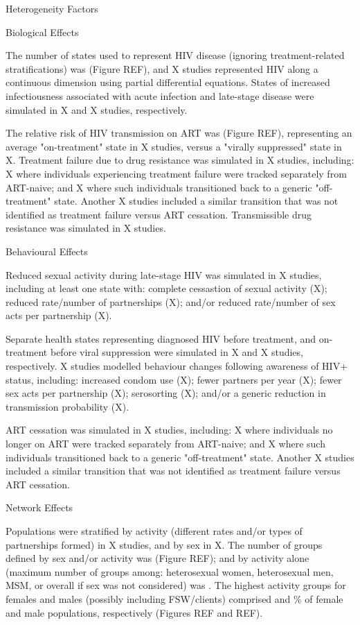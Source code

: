 Heterogeneity Factors

Biological Effects

The \xdmdef number of states used to represent HIV disease
(ignoring treatment-related stratifications) was  (Figure REF),
and X studies represented HIV along a continuous dimension
using partial differential equations.
States of increased infectiousness associated with acute infection and late-stage disease
were simulated in X and X studies, respectively.

The relative risk of HIV transmission on ART was 
(Figure REF),
representing an average "on-treatment" state in X studies,
versus a "virally suppressed" state in X.
Treatment failure due to drug resistance was simulated in X studies, including:
X where individuals experiencing treatment failure
were tracked separately from ART-naive; and
X where such individuals
transitioned back to a generic "off-treatment" state.
Another X studies included a similar transition
that was not identified as treatment failure versus ART cessation.
Transmissible drug resistance was simulated in X studies.

Behavioural Effects

Reduced sexual activity during late-stage HIV was simulated in X studies,
including at least one state with:
complete cessastion of sexual activity (X);
reduced rate/number of partnerships (X); and/or
reduced rate/number of sex acts per partnership (X).

Separate health states representing diagnosed HIV before treatment,
and on-treatment before viral suppression were simulated in
X and X studies, respectively.
X studies modelled behaviour changes following awareness of HIV+ status, including:
increased condom use (X);
fewer partners per year (X);
fewer sex acts per partnership (X);
serosorting (X); and/or
a generic reduction in transmission probability (X).

ART cessation was simulated in X studies, including:
X where individuals no longer on ART
were tracked separately from ART-naive; and
X where such individuals
transitioned back to a generic "off-treatment" state.
Another X studies included a similar transition
that was not identified as treatment failure versus ART cessation.

Network Effects

Populations were stratified by activity (different rates and/or types of partnerships formed)
in X studies, and by sex in X.
The number of groups defined by sex and/or activity was   (Figure REF);
and by activity alone (maximum number of groups among:
heterosexual women, heterosexual men, MSM, or overall if sex was not considered) was .
The highest activity groups for females and males (possibly including FSW/clients) comprised
 and \% of female and male populations, respectively
(Figures REF and REF).

